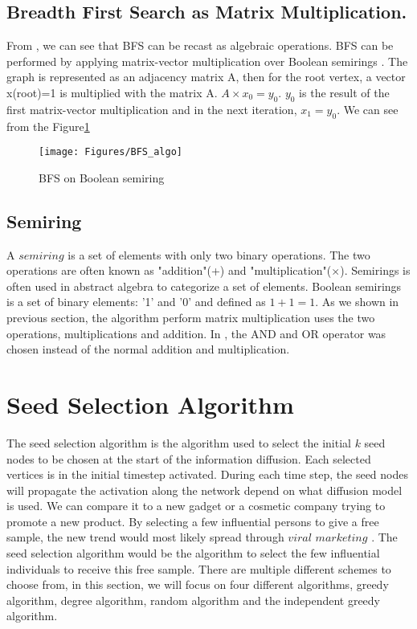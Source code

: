 \subsection{Breadth First Search as Matrix Multiplication.} \label{BFS as Matrix}
From  \cite{AlgoToMath}, we can see that BFS can be recast as algebraic operations. BFS can be performed by applying matrix-vector multiplication over Boolean semirings \cite{HybridBFS2015}. The graph is represented as an adjacency matrix A, then for the root vertex, a vector x(root)=1 is multiplied with the matrix A. $A \times x_0 = y_0$. $y_0$ is the result of the first matrix-vector multiplication and in the next iteration, $x_1 = y_0$. We can see from the Figure\ref{fig:bfsMatrix}

\begin{figure}
    \texttt{[image: Figures/BFS\_algo]}
    \caption{BFS on Boolean semiring}
    \label{fig:bfsMatrix}
\end{figure}

\subsection{Semiring}
A $semiring$ is a set of elements with only two binary operations. The two operations are often known as "addition"(+) and "multiplication"($\times$). Semirings is often used in abstract algebra to categorize a set of elements. Boolean semirings is a set of binary elements: '1' and '0' and defined as $1+1=1$.  As we shown in previous section, the algorithm perform matrix multiplication uses the two operations, multiplications and addition. In  \cite{HybridBFS2015}, the AND and OR operator was chosen instead of the normal addition and multiplication. 

 
 
\section{Seed Selection Algorithm}
The seed selection algorithm is the algorithm used to select the initial $k$ seed nodes to be chosen at the start of the information diffusion. Each selected vertices is in the initial timestep activated. During each time step, the seed nodes will propagate the activation along the network depend on what diffusion model is used. We can compare it to a new gadget or a cosmetic company trying to promote a new product. By selecting a few influential persons to give a free sample, the new trend would most likely spread through $viral$ $marketing$ \cite{ViralMarketing}. The seed selection algorithm would be the algorithm to select the few influential individuals to receive this free sample. There are multiple different schemes to choose from, in this section, we will focus on four different algorithms, greedy algorithm, degree algorithm, random algorithm and the independent greedy algorithm.

